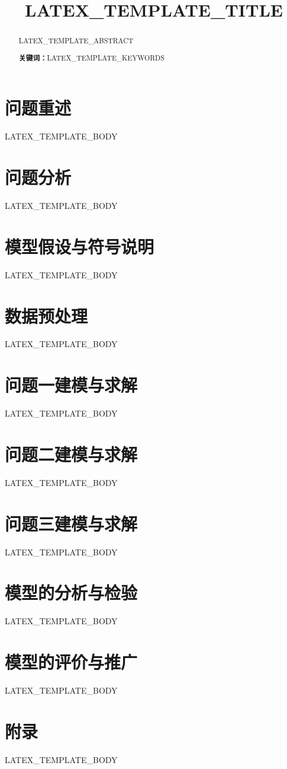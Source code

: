 \documentclass[UTF8,12pt,a4paper]{ctexart}
\title{LATEX_TEMPLATE_TITLE}
\author{}
\date{}
\newcommand{\keywords}[1]{\par\noindent\textbf{关键词：}#1}
\begin{document}
\begin{abstract}
LATEX_TEMPLATE_ABSTRACT
\keywords{LATEX_TEMPLATE_KEYWORDS}
\end{abstract}

\section{问题重述}
LATEX_TEMPLATE_BODY


\section{问题分析}
LATEX_TEMPLATE_BODY

\section{模型假设与符号说明}
LATEX_TEMPLATE_BODY

\section{数据预处理}
LATEX_TEMPLATE_BODY

\section{问题一建模与求解}
LATEX_TEMPLATE_BODY

\section{问题二建模与求解}
LATEX_TEMPLATE_BODY

\section{问题三建模与求解}
LATEX_TEMPLATE_BODY

\section{模型的分析与检验}
LATEX_TEMPLATE_BODY

\section{模型的评价与推广}
LATEX_TEMPLATE_BODY




\appendix
\section{附录}
LATEX_TEMPLATE_BODY
\end{document}
